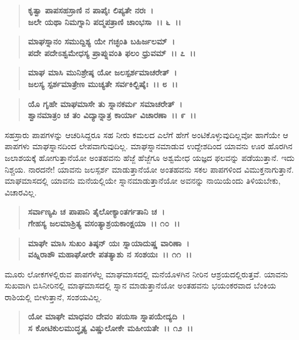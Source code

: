 \begin{verse}
\textbf{ಕೃತ್ವಾ ಪಾಪಸಹಸ್ರಾಣಿ ನ ಪಾಪೈಃ ಲಿಪ್ಯತೇ ನರಃ~।}\\\textbf{ಜಲೇ ಯಥಾ ನಿಮಗ್ನಾನಿ ಪದ್ಮಪತ್ರಾಣಿ ಚಾಂಭಸಾ~।। ೬~।। }
\end{verse}

\begin{verse}
\textbf{ಮಾಘಸ್ನಾನಂ ಸಮುದ್ದಿಶ್ಯ ಯೇ ಗಚ್ಛಂತಿ ಬಹಿರ್ಜಲಮ್~।}\\\textbf{ಪದೇ ಪದೇಽಶ್ವಮೇಧಸ್ಯ ಪ್ರಾಪ್ನುವಂತಿ ಫಲಂ ಧ್ರುವಮ್~।। ೭~।। }
\end{verse}

\begin{verse}
\textbf{ಮಾಘ ಮಾಸಿ ಮುನಿಶ್ರೇಷ್ಠ ಯೋ ಜಲಸ್ಪರ್ಶಮಾಚರೇತ್~।}\\\textbf{ಜಲಸ್ಯ ಸ್ಪರ್ಶಮಾತ್ರೇಣ ಮುಚ್ಯತೇ ಸರ್ವಕಿಲ್ಬಿಷೈಃ~।। ೮~।। }
\end{verse}

\begin{verse}
\textbf{ಯೊ ಗೃಹೇ ಮಾಘಮಾಸೇ ತು ಸ್ನಾನಕರ್ಮ ಸಮಾಚರೇತ್~।}\\\textbf{ಶ್ವಾನಮಾತ್ರಂ ಚ ತಂ ವಿದ್ಯಾನ್ನಾತ್ರ ಕಾರ್ಯಾ ವಿಚಾರಣಾ~।। ೯~।।}
\end{verse}

ಸಹಸ್ರಾರು ಪಾಪಗಳನ್ನು ಆಚರಿಸಿದ್ದರೂ ಸಹ ನೀರು ಕಮಲದ ಎಲೆಗೆ ಹೇಗೆ ಅಂಟಿಕೊಳ್ಳುವುದಿಲ್ಲವೋ ಹಾಗೆಯೇ ಆ ಪಾಪಗಳು ಮಾಘಸ್ನಾನದಿಂದ ಲೇಪವಾಗುವುದಿಲ್ಲ. ಮಾಘಸ್ನಾನ\-ಮಾಡುವ ಉದ್ದೇಶದಿಂದ ಯಾವನು ಊರ ಹೊರಗಿನ ಜಲಾಶಯಕ್ಕೆ ಹೋಗುತ್ತಾನೆಯೋ ಅಂತಹವನು ಹೆಜ್ಜೆ ಹೆಜ್ಜೆಗೂ ಅಶ್ವಮೇಧ ಯಜ್ಞದ ಫಲವನ್ನು ಪಡೆಯುತ್ತಾನೆ. ಇದು ನಿಶ್ಚಯ. ನಾರದನೇ! ಯಾವನು ಜಲಸ್ಪರ್ಶ ಮಾಡುತ್ತಾನೆಯೋ ಅಂತಹವನು ಸಕಲ ಪಾಪಗಳಿಂದ ವಿಮುಕ್ತನಾಗುತ್ತಾನೆ. ಮಾಘಮಾಸದಲ್ಲಿ ಯಾವನು ಮನೆಯಲ್ಲಿಯೇ ಸ್ನಾನಮಾಡುತ್ತಾನೆಯೋ ಅವನನ್ನು ನಾಯಿಯೆಂದು ತಿಳಿಯಬೇಕು, ವಿಚಾರವಿಲ್ಲ.

\begin{verse}
\textbf{ಸರ್ವಾಣ್ಯಪಿ ಚ ಪಾಪಾನಿ ತೈಲೋಕ್ಯಾಂತರ್ಗತಾನಿ ಚ~।}\\\textbf{ಗೇಹಸ್ಯ ಜಲಮಾಶ್ರಿತ್ಯ ವಸಂತ್ಯಾಶ್ರಯಕಾಂಕ್ಷಯಾ~।। ೧೦~।।}
\end{verse}

\begin{verse}
\textbf{ಮಾಘೇ ಮಾಸಿ ಸುಖಂ ತಿಷ್ಠನ್ ಯಃ ಸ್ನಾಯಾದುಷ್ಣ ವಾರಿಣಾ~।}\\\textbf{ವಹ್ನಿರಾಶೌ ಮಹಾಘೋರೇ ಪತತ್ಯಾಶು ನ ಸಂಶಯಃ~।। ೧೧~।।}
\end{verse}

ಮೂರು ಲೋಕಗಳಲ್ಲಿರುವ ಪಾಪಗಳೆಲ್ಲ ಮಾಘಮಾಸದಲ್ಲಿ ಮನೆಯೊಳಗಿನ ನೀರಿನ ಆಶ್ರಯದಲ್ಲಿರುತ್ತವೆ. ಯಾವನು ಸುಖವಾಗಿ ಬಿಸಿನೀರಿನಲ್ಲಿ ಮಾಘಮಾಸದಲ್ಲಿ ಸ್ನಾನ ಮಾಡುತ್ತಾನೆಯೋ ಅಂತಹವನು ಭಯಂಕರವಾದ ಬೆಂಕಿಯ ರಾಶಿಯಲ್ಲಿ ಬೀಳುತ್ತಾನೆ, ಸಂಶಯವಿಲ್ಲ.

\begin{verse}
\textbf{ಯೋ ಮಾಘೇ ಮಾಧವಂ ದೇವಂ ಪಯಸಾ ಸ್ನಾಪಯೇದ್ಯದಿ~।}\\\textbf{ಸ ಕೋಟಿಕುಲಮುದ್ಧೃತ್ಯ ವಿಷ್ಣುಲೋಕೇ ಮಹೀಯತೇ~।। ೧೨~।। }
\end{verse}

